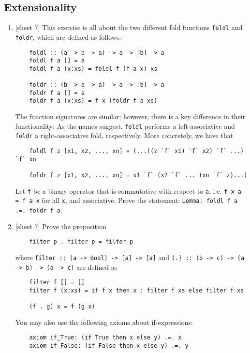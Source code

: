 \documentclass{article}
\def\code#1{\texttt{#1}}
\begin{document}
\subsection{Extensionality}
\begin{enumerate}
    \item {[sheet 7]} This exercise is all about the two different fold functions \code{foldl} and \code{foldr}, which are defined as follows:
        \begin{verbatim}
    foldl :: (a -> b -> a) -> a -> [b] -> a
    foldl f a [] = a
    foldl f a (x:xs) = foldl f (f a x) xs

    foldr :: (b -> a -> a) -> a -> [b] -> a
    foldr f a [] = a
    foldr f a (x:xs) = f x (foldr f a xs)
        \end{verbatim}
        The function signatures are similar; however, there is a key difference in their functionality: As the names suggest, \code{foldl} performs a left-associative and \code{foldr} a right-associative fold, respectively. More concretely, we have that
        \begin{verbatim}
    foldl f z [x1, x2, ..., xn] = (...((z `f` x1) `f` x2) `f` ...) `f` xn

    foldr f z [x1, x2, ..., xn] = x1 `f` (x2 `f` ... (xn `f` z)...)
        \end{verbatim}
        Let \code{f} be a binary operator that is commutative with respect to \code{a}, i.e. \code{f x a = f a x} for all \code{x}, and associative. Prove the statement: \code{Lemma: foldl f a .=. foldr f a}.

    \item {[sheet 7]} Prove the proposition
        \begin{verbatim}
    filter p . filter p = filter p
        \end{verbatim}
        where \code{filter :: (a -> Bool) -> [a] -> [a]} and \code{(.) :: (b -> c) -> (a -> b) -> (a -> c)} are defined as
        \begin{verbatim}
    filter f [] = []
    filter f (x:xs) = if f x then x : filter f xs else filter f xs

    (f . g) x = f (g x)
        \end{verbatim}
        You may also use the following axioms about if-expressions:
        \begin{verbatim}
    axiom if_True: (if True then x else y) .=. x
    axiom if_False: (if False then x else y) .=. y
        \end{verbatim}
\end{enumerate}
\end{document}
